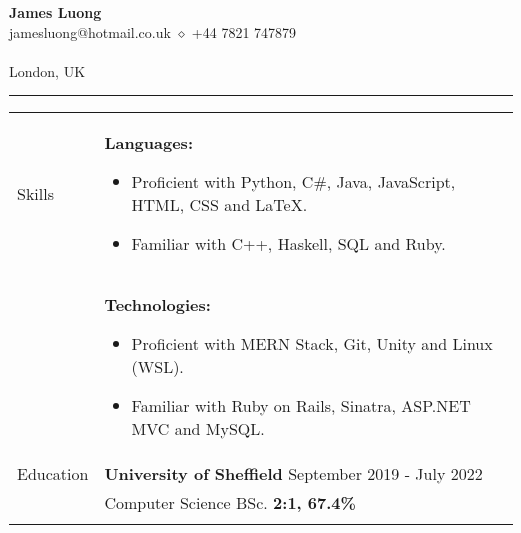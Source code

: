 \documentclass[11pt]{article}
\begin{document}
\begin{minipage}[t][0pt]{\linewidth} %
\begin{center}
	{\LARGE\textbf{James Luong}} \\
	jamesluong@hotmail.co.uk $\diamond$ +44 7821 747879 \\
	
	\href{https://jluong23.github.io/blog}{\color{Blue}{jluong23.github.io/blog}} \\
	
	London, UK \\
	\hrule
\end{center}


\begin{tabular}[t]{p{2cm} p{14cm}}
	{Skills} &
		\textbf{Languages:} 
	    \begin{itemize}
    		\renewcommand{\labelitemi}{$\diamond$}
    			\item Proficient with Python, C\#, Java, JavaScript, HTML, CSS and \LaTeX. 
    			\item Familiar with C++, Haskell, SQL and Ruby.
		\end{itemize} \\ &

		\textbf{Technologies:} 
	    \begin{itemize}
    		\renewcommand{\labelitemi}{$\diamond$}
    			\item Proficient with MERN Stack, Git, Unity and Linux (WSL).
    			\item Familiar with Ruby on Rails, Sinatra, ASP.NET MVC and MySQL.
		\end{itemize} \\
	{Education} &

		\textbf{University of Sheffield} \hfill September 2019 - July 2022 \\ &
		Computer Science BSc. \hfill \textbf{2:1, 67.4\%}  \\ &


\end{tabular}
\end{minipage}
\end{document}
